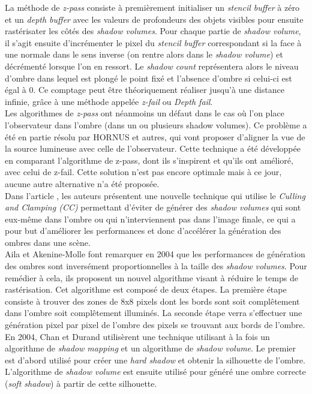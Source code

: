 \documentclass[a4paper,10pt]{report}
\begin{document}
La méthode de \textit{z-pass} consiste à premièrement initialiser un \textit{stencil buffer} à zéro et un \textit{depth buffer} avec les valeurs de profondeurs des objets visibles pour ensuite rastérisater les côtés des \textit{shadow volumes}. Pour chaque partie de \textit{shadow volume}, il s'agit ensuite d'incrémenter le pixel du \textit{stencil buffer} correspondant si la face à une normale dans le sens inverse (on rentre alors dans le \textit{shadow volume}) et décrémenté lorsque l'on en ressort. Le \textit{shadow count} représentera alors le niveau d'ombre dans lequel est plongé le point fixé et l'absence d'ombre si celui-ci est égal à 0.\cite{surveyofshadowalgorithms} Ce comptage peut être théoriquement réaliser jusqu'à une distance infinie, grâce à une méthode appelée \textit{z-fail} ou \textit{Depth fail}\cite{bilodeau1999real, carmack2000z}.
\\

Les algorithmes de \textit{z-pass} ont néanmoins un défaut dans le cas où l'on place l'observateur dans l'ombre (dans un ou plusieurs shadow volumes). Ce problème a été en partie résolu par HORNUS et autres\cite{hornus2005zp+}, qui vont proposer d'aligner la vue de la source lumineuse avec celle de l'observateur. Cette technique a été développée en comparant l'algorithme de z-pass, dont ils s'inspirent et qu'ils ont amélioré, avec celui de z-fail. Cette solution n'est pas encore optimale mais à ce jour, aucune autre alternative n'a été proposée.
\\

Dans l'article \cite{lloyd2004cc}, les auteurs présentent une nouvelle technique qui utilise le \textit{Culling and Clamping (CC)} permettant d'éviter de générer des \textit{shadow volumes} qui sont eux-même dans l'ombre ou qui n'interviennent pas dans l'image finale, ce qui a pour but d'améliorer les performances et donc d'accélérer la génération des ombres dans une scène.
\\

Aila et Akenine-Molle font remarquer en 2004 \cite{aila2004hierarchical} que les performances de génération des ombres sont inversément proportionnelles à la taille des \textit{shadow volumes}. Pour remédier à cela, ils proposent un nouvel algorithme visant à réduire le temps de rastérisation. Cet algorithme est composé de deux étapes. La première étape consiste à trouver des zones de 8x8 pixels dont les bords sont soit complêtement dans l'ombre soit complêtement illuminés. La seconde étape verra s'effectuer une génération pixel par pixel de l'ombre des pixels se trouvant aux bords de l'ombre.
\\
En 2004, Chan et Durand\cite{chan2004efficient} utilisèrent une technique utilisant à la fois un algorithme de \textit{shadow mapping} et un algorithme de \textit{shadow volume}. Le premier est d'abord utilisé pour créer une \textit{hard shadow} et obtenir la silhouette de l'ombre. L'algorithme de \textit{shadow volume} est ensuite utilisé pour généré une ombre correcte (\textit{soft shadow}) à partir de cette silhouette.
\end{document}
